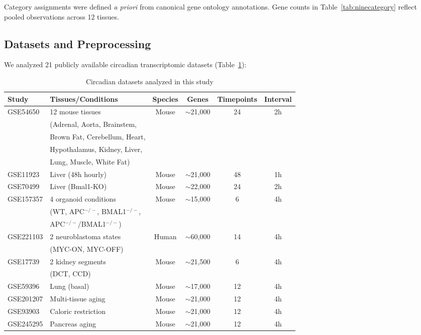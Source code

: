\documentclass[11pt,a4paper]{article}
\begin{document}
Category assignments were defined \textit{a priori} from canonical gene ontology annotations. Gene counts in Table~\ref{tab:ninecategory} reflect pooled observations across 12 tissues.

\subsection{Datasets and Preprocessing}

We analyzed 21 publicly available circadian transcriptomic datasets (Table~\ref{tab:datasets}):

\begin{table}[H]
\centering
\caption{Circadian datasets analyzed in this study}
\label{tab:datasets}
\begin{tabular}{llcccc}
\toprule
Study & Tissues/Conditions & Species & Genes & Timepoints & Interval \\
\midrule
GSE54650 & 12 mouse tissues & Mouse & $\sim$21,000 & 24 & 2h \\
         & (Adrenal, Aorta, Brainstem, & & & & \\
         & Brown Fat, Cerebellum, Heart, & & & & \\
         & Hypothalamus, Kidney, Liver, & & & & \\
         & Lung, Muscle, White Fat) & & & & \\
\midrule
GSE11923 & Liver (48h hourly) & Mouse & $\sim$21,000 & 48 & 1h \\
\midrule
GSE70499 & Liver (Bmal1-KO) & Mouse & $\sim$22,000 & 24 & 2h \\
\midrule
GSE157357 & 4 organoid conditions & Mouse & $\sim$15,000 & 6 & 4h \\
          & (WT, APC$^{-/-}$, BMAL1$^{-/-}$, & & & & \\
          & APC$^{-/-}$/BMAL1$^{-/-}$) & & & & \\
\midrule
GSE221103 & 2 neuroblastoma states & Human & $\sim$60,000 & 14 & 4h \\
          & (MYC-ON, MYC-OFF) & & & & \\
\midrule
GSE17739 & 2 kidney segments & Mouse & $\sim$21,500 & 6 & 4h \\
         & (DCT, CCD) & & & & \\
\midrule
GSE59396 & Lung (basal) & Mouse & $\sim$17,000 & 12 & 4h \\
\midrule
GSE201207 & Multi-tissue aging & Mouse & $\sim$21,000 & 12 & 4h \\
\midrule
GSE93903 & Caloric restriction & Mouse & $\sim$21,000 & 12 & 4h \\
\midrule
GSE245295 & Pancreas aging & Mouse & $\sim$21,000 & 12 & 4h \\
\bottomrule
\end{tabular}
\end{table}
\end{document}
